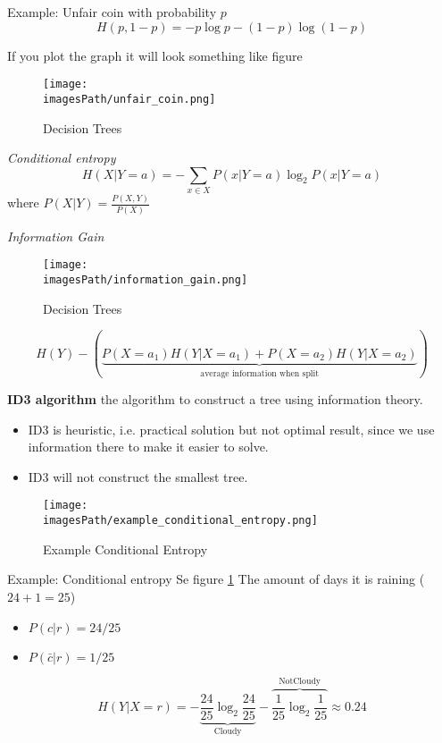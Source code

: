 \begin{exampleblock}{Example: Unfair coin with probability $p$}
   \begin{equation*}
       H(p, 1-p) = -p\log p -(1-p)\log(1-p)
   \end{equation*} 

   If you plot the graph it will look something like figure 
\end{exampleblock}
\begin{figure}[!h]
    \centering
    \texttt{[image: \\imagesPath/unfair\_coin.png]}
    \caption{Decision Trees}
\end{figure}

\textit{Conditional entropy}
\begin{equation*}
    H(X|Y=a) = -\sum_{x\in X}P(x|Y=a)\log_2 P(x|Y=a)
\end{equation*}
where $P(X|Y) = \frac{P(X,Y)}{P(X)}$

\textit{Information Gain}
\begin{figure}[!h]
    \centering
    \texttt{[image: \\imagesPath/information\_gain.png]}
    \caption{Decision Trees}
\end{figure}

\begin{equation*}
    H(Y) - \left( \underbrace{P(X=a_1)H(Y|X=a_1) + P(X=a_2)H(Y|X=a_2)}_{\text{average information when split}} \right)
\end{equation*}

\textbf{ID3 algorithm} the algorithm to construct a tree using information
theory.
\begin{itemize}
    \item ID3 is heuristic, i.e. practical solution but not optimal result, since we use information there to make it easier to solve.
    \item ID3 will not construct the smallest tree.
\end{itemize}

\begin{figure}[!h]
    \centering
    \texttt{[image: \\imagesPath/example\_conditional\_entropy.png]}
    \caption{Example Conditional Entropy}
    \label{fig:example_conditional_entropy}
\end{figure}
\begin{exampleblock}{Example: Conditional entropy}
    Se figure \ref{fig:example_conditional_entropy}
    The amount of days it is raining ($24+1=25$)
    \begin{itemize}
        \item $P(c|r) = 24/25$
        \item $P(\bar{c}|r) = 1/25$ 
    \end{itemize}
    
    \begin{equation*}
        H(Y|X=r) = -\underbrace{\frac{24}{25}\log_2\frac{24}{25}}_{\text{Cloudy}} - \overbrace{\frac{1}{25}\log_2\frac{1}{25}}^{\text{NotCloudy}} \approx 0.24
    \end{equation*}
\end{exampleblock}

